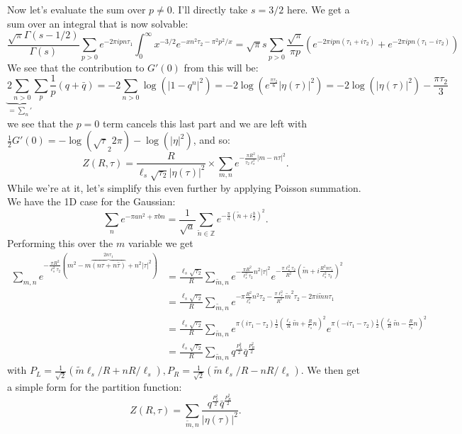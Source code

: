 \documentclass[11pt]{article}
\begin{document}
\begin{enumerate}
	Now let's evaluate the sum over $p \neq 0$. I'll directly take $s=3/2$ here. We get a sum over an integral that is now solvable:
	\[
		\frac{\sqrt{\pi} \Gamma(s-1/2)}{\Gamma(s)} \sum_{p > 0} e^{-2 \pi i p n \tau_1} \int_{0}^\infty x^{-3/2} e^{-x n^2 \tau_2 - \pi^2 p^2/x} = \sqrt{\pi} s \sum_{p > 0} \frac{\sqrt{\pi}}{\pi p} (e^{-2 \pi i p n (\tau_1 + i \tau_2)} + e^{-2 \pi i p n (\tau_1 - i \tau_2)})
	\]
	We see that the contribution to $G'(0)$ from this will be:
	\[
		\underbrace{2 \sum_{n > 0}}_{= {\sum_n}'} \sum_p \frac{1}{p} (q + \bar q) = - 2 \sum_{n>0} \log(|1-q^n|^2) = -2 \log( e^{\frac{\pi \tau_2}{6}} |\eta(\tau)|^2) = -2 \log(|\eta(\tau)|^2) - \frac{\pi \tau_2}{3}
	\]
	we see that the $p=0$ term cancels this last part and we are left with 
	$\frac12 G'(0) = -\log(\sqrt \tau_2 2 \pi) - \log(|\eta|^2)$, and so:
	\[
		Z(R, \tau) = \frac{R}{\ell_s \sqrt{\tau_2} |\eta(\tau)|^2} \times \sum_{m, n} e^{-\frac{\pi R^2}{\tau_2 \ell_s^2} |m - n \tau|^2}.
	\]
	While we're at it, let's simplify this even further by applying Poisson summation. We have the 1D case for the Gaussian:
	\[
		\sum_{n} e^{-\pi a n^2 + \pi b n} = \frac{1}{\sqrt a} \sum_{\tilde n \in \mathbb Z} e^{-\frac{\pi}{a} (\tilde n + i \frac{b}{2})^2}.
	\]
	Performing this over the $m$ variable we get
	\[
	\begin{aligned}
		\sum_{m, n} e^{- \frac{\pi R^2}{\ell_s^2 \tau_2} (m^2 - m \overbrace{(n \tau + n \bar \tau)}^{2 n \tau_1} +  n^2 |\tau|^2)}
		& = \frac{\ell_s \sqrt{\tau_2}}{R} \sum_{\tilde m, n} e^{-\frac{\pi R^2}{\ell_s^2 \tau_2} n^2 |\tau|^2} e^{-\frac{\pi \ell_s^2 \tau_2}{R^2} \left(\tilde m + i \frac{R^2 n \tau_1}{\ell_s^2 \tau_2}\right)^2}\\
		&= \frac{\ell_s \sqrt{\tau_2}}{R} \sum_{\tilde m, n} e^{-\pi\frac{R^2}{\ell_s^2} n^2 \tau_2 - \frac{\pi \ell_s^2}{R^2} \tilde m^2 \tau_2 - 2 \pi i \tilde m n \tau_1}\\
		&= \frac{\ell_s \sqrt{\tau_2}}{R} \sum_{\tilde m, n} e^{\pi (i \tau_1 - \tau_2) \frac12 \left(\frac{\ell_s}{R} \tilde m + \frac{R}{\ell_s} n\right)^2 } e^{\pi (-i \tau_1 - \tau_2) \frac12 \left(\frac{\ell_s}{R} \tilde m - \frac{R}{\ell_s} n\right)^2 }\\
		&= \frac{\ell_s \sqrt{\tau_2}}{R} \sum_{\tilde m, n} q^{\frac{P_L^2}{2}} \bar q^{\frac{P_R^2}{2}}
	\end{aligned}
	\]
	with $P_L = \frac{1}{\sqrt 2} (\tilde m \ell_s/R + n R/\ell_s), P_R = \frac{1}{\sqrt 2} (\tilde m \ell_s/R - n R/\ell_s)$. We then get a simple form for the partition function:
	\[
		Z(R, \tau) = \sum_{\tilde m, n} \frac{q^{\frac{P_L^2}{2}} \bar q^{\frac{P_R^2}{2}}}{|\eta(\tau)|^2}.
	\]
	

\end{enumerate}
\end{document}

